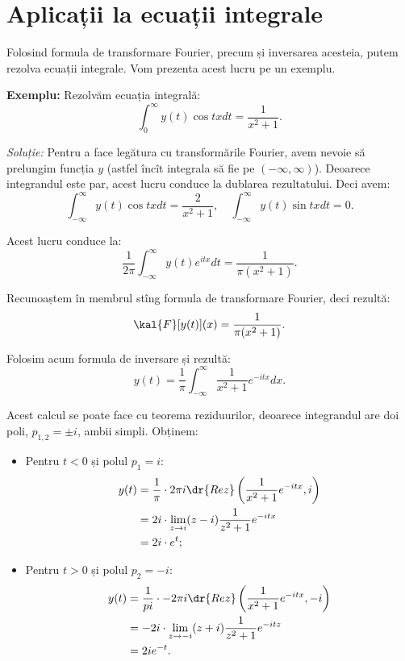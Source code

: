\section{Aplicații la ecuații integrale}

Folosind formula de transformare Fourier, precum și inversarea acesteia,
putem rezolva ecuații integrale. Vom prezenta acest lucru pe un exemplu.

\textbf{Exemplu:} Rezolvăm ecuația integrală:
\[
  \int_0^\infty y(t) \cos tx dt = \dfrac{1}{x^2 + 1}.
\]

\emph{Soluție:} Pentru a face legătura cu transformările Fourier,
avem nevoie să prelungim funcția $ y $ (astfel încît integrala
să fie pe $ (-\infty, \infty) $). Deoarece integrandul este par,
acest lucru conduce la dublarea rezultatului. Deci avem:
\[
  \int_{-\infty}^\infty y(t) \cos tx dt = \dfrac{2}{x^2 + 1}, \quad %
  \int_{-\infty}^\infty y(t) \sin tx dt = 0.
\]

Acest lucru conduce la:
\[
  \dfrac{1}{ 2\pi} \int_{-\infty}^\infty y(t) e^{itx} dt = \dfrac{1}{\pi(x^2 + 1)}.
\]

Recunoaștem în membrul stîng formula de transformare Fourier,
deci rezultă:
\[
  \kal{F}[y(t)](x) = \dfrac{1}{\pi(x^2 + 1)}.
\]

Folosim acum formula de inversare și rezultă:
\[
  y(t) = \dfrac{1}{\pi} \int_{-\infty}^\infty \dfrac{1}{x^2 + 1} e^{-itx} dx.
\]

Acest calcul se poate face cu teorema reziduurilor, deoarece integrandul
are doi poli, $ p_{1,2} = \pm i $, ambii simpli. Obținem:
\begin{itemize}
\item Pentru $ t < 0 $ și polul $ p_1 = i $:
  \begin{align*}
    y(t) &= \dfrac{1}{\pi} \cdot 2 \pi i \dr{Rez}\left(\dfrac{1}{x^2 + 1} e^{-itx}, i\right) \\
         &= 2 i \cdot \lim_{z \to i} (z - i) \dfrac{1}{z^2 + 1} e^{-itx} \\
         &= 2i \cdot e^t;
  \end{align*}
\item Pentru $ t > 0 $ și polul $ p_2 = -i $:
  \begin{align*}
    y(t) &= \dfrac{1}{pi} \cdot - 2\pi i \dr{Rez}\left( \dfrac{1}{x^2 + 1} e^{-itx}, -i\right) \\
         &= -2i \cdot \lim_{z \to -i} (z + i) \dfrac{1}{z^2 + 1} e^{-itz} \\
         &= 2i e^{-t}.
  \end{align*}
\end{itemize}

